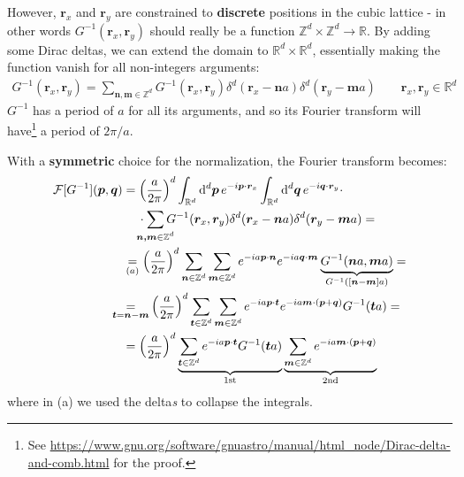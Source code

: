\documentclass[../../main.tex]{subfiles}
\begin{document}
However, $\bm{r}_x$ and $\bm{r}_y$ are constrained to \textbf{discrete} positions in the cubic lattice - in other words $G^{-1}(\bm{r}_x, \bm{r}_y)$ should really be a function $\mathbb{Z}^{d}\times \mathbb{Z}^d \to \mathbb{R}$. By adding some Dirac deltas, we can extend the domain to $\mathbb{R}^d \times \mathbb{R}^d$, essentially making the function vanish for all non-integers arguments:
\begin{align*}
    G^{-1}(\bm{r}_x, \bm{r}_y) = \sum_{\bm{n,m} \in \mathbb{Z}^d} G^{-1}(\bm{r}_x, \bm{r}_y) \delta^d(\bm{r}_x-\bm{n}a) \delta^d(\bm{r}_y - \bm{m} a) \qquad \bm{r}_x, \bm{r}_y \in \mathbb{R}^d
\end{align*}
$G^{-1}$ has a period of $a$ for all its arguments, and so its Fourier transform will have\footnote{See \url{https://www.gnu.org/software/gnuastro/manual/html_node/Dirac-delta-and-comb.html} for the proof.} a period of $2\pi/a$.

With a \textbf{symmetric} choice for the normalization, the Fourier transform becomes:
\begin{align*}
    \mathcal{F}[G^{-1}](\bm{p}, \bm{q}) &= \left(\frac{a}{2\pi} \right)^d \int_{\mathbb{R}^d} \dd[d]{\bm{p}} e^{-i \bm{p} \cdot \bm{r}_x} \int_{\mathbb{R}^d} \dd[d]{\bm{q}} e^{-i \bm{q} \cdot \bm{r}_y} \cdot \\* %
    &\quad\>\cdot \sum_{\mathclap{\bm{n,m} \in \mathbb{Z}^d}} G^{-1}(\bm{r}_x, \bm{r}_y) \delta^d(\bm{r}_x-\bm{n}a) \delta^d(\bm{r}_y - \bm{m} a) =\\
    &\underset{(a)}{=}  \left(\frac{a}{2\pi} \right)^d  \sum_{\bm{n} \in \mathbb{Z}^d} \sum_{\bm{m} \in \mathbb{Z}^d} e^{-i a \bm{p}\cdot \bm{n}} e^{-i a \bm{q} \cdot \bm{m}} \underbrace{G^{-1}(\bm{n}a, \bm{m}a)}_{G^{-1}([\bm{n}-\bm{m}]a)} = \\
    &\underset{\mathclap{\bm{t} = \bm{n}- \bm{m}}}{=}\quad \left(\frac{a}{2\pi} \right)^d    \sum_{\bm{t} \in \mathbb{Z}^d} \sum_{\bm{m} \in \mathbb{Z}^d} e^{-i a \bm{p} \cdot \bm{t}} e^{-i a \bm{m} \cdot (\bm{p} + \bm{q})} G^{-1}(\bm{t}a) =\\
    &=  \left(\frac{a}{2\pi} \right)^d \underbrace{\sum_{\bm{t} \in \mathbb{Z}^d} e^{-i a \bm{p} \cdot \bm{t}} G^{-1}(\bm{t} a)}_{1\mathrm{st}} \underbrace{\sum_{\bm{m} \in \mathbb{Z}^d} e^{-i a \bm{m} \cdot (\bm{p} + \bm{q})}}_{2\mathrm{nd}}
\end{align*} 
where in (a) we used the delta\textit{s} to collapse the integrals.
\end{document}
